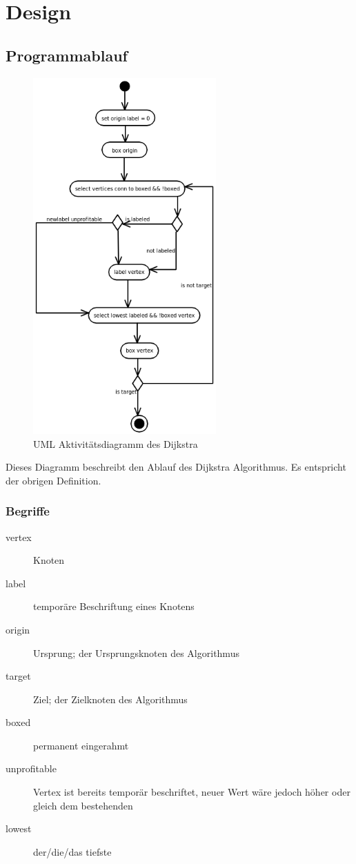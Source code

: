 \documentclass[a4paper,titlepage]{article}
\begin{document}
\section{Design}

\subsection{Programmablauf}

\begin{figure}
\begin{center}
	\includegraphics[width=7cm]{activity_diagram.png}
\end{center}
\caption{UML Aktivitätsdiagramm des Dijkstra}
\vspace{-60pt}
\end{figure}

Dieses Diagramm beschreibt den Ablauf des Dijkstra Algorithmus. Es entspricht der obrigen Definition.

\subsubsection*{Begriffe}

\begin{description}
\item[vertex] Knoten
\item[label] temporäre Beschriftung eines Knotens
\item[origin] Ursprung; der Ursprungsknoten des Algorithmus
\item[target] Ziel; der Zielknoten des Algorithmus
\item[boxed] permanent eingerahmt
\item[unprofitable] Vertex ist bereits temporär beschriftet, neuer Wert wäre jedoch höher oder gleich dem bestehenden
\item[lowest] der/die/das tiefste
\end{description}
\end{document}

